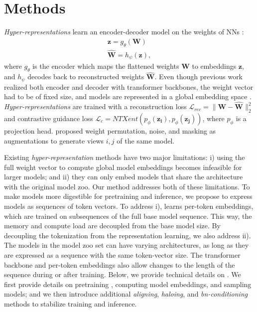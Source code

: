 \section{Methods}

\textit{Hyper-representations} learn an encoder-decoder model on the weights of NNs \citep{schurholtSelfSupervisedRepresentationLearning2021}: 
    \begin{align}
        \mathbf{z} = g_{\theta}(\mathbf{W}) \label{eq:hrep_enc}\\
        \mathbf{\widehat{W}} = h_{\psi}( \mathbf{z} ),\label{eq:hrep_dec}
    \end{align}
where $g_{\theta}$ is the encoder which maps the flattened weights $\mathbf{W}$ to embeddings $\mathbf{z}$, and $h_{\psi}$ decodes back to reconstructed weights $\mathbf{\widehat{W}}$.
Even though previous work realized both encoder and decoder with transformer backbones, the weight vector had to be of fixed size, and models are represented in a global embedding space \citep{schurholtSelfSupervisedRepresentationLearning2021, schurholtHyperRepresentationsGenerativeModels2022}. %
\textit{Hyper-representations} are trained with a reconstruction loss $\mathcal{L}_{rec}=\|\mathbf{W}-\mathbf{\widehat{W}} \|_2^2$ and contrastive guidance loss $\mathcal{L}_{c} = NTXent(p_{\phi}(\mathbf{z_i}),p_{\phi}(\mathbf{z_j}))$, where $p_{\phi}$ is a projection head. \citet{schurholtSelfSupervisedRepresentationLearning2021} proposed weight permutation, noise, and masking as augmentations to generate views $i,j$ of the same model.


Existing \textit{hyper-representation} methods have two major limitations: 
i) using the full weight vector to compute global model embeddings becomes infeasible for larger models; 
and ii) they can only embed models that share the architecture with the original model zoo.
Our \ourmethod method addresses both of these limitations. 
To make models more digestible for pretraining and inference, we propose to express models as sequences of token vectors.
To address i), \ourmethod learns per-token embeddings, which are trained on subsequences of the full base model sequence. 
This way, the memory and compute load are decoupled from the base model size. 
By decoupling the tokenization from the representation learning, we also address ii). 
The models in the model zoo set can have varying architectures, as long as they are expressed as a sequence with the same token-vector size. 
The transformer backbone and per-token embeddings also allow changes to the length of the sequence during or after training. 
Below, we provide technical details on \ourmethod.
We first provide details on pretraining \ourmethod, computing model embeddings, and sampling models; and we then introduce additional \textit{aligning}, \textit{haloing}, and \textit{bn-conditioning} methods to stabilize training and inference.

